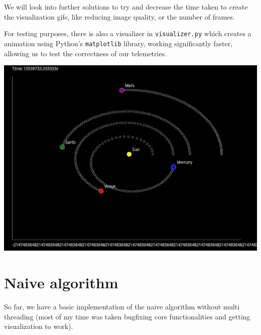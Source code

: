 \documentclass{article}
\begin{document}
We will look into further solutions to try and decrease the time taken to create the visualization gifs, like reducing image quality, or the number of frames. 

For testing purposes, there is also a visualizer in \texttt{visualizer.py} which creates a animation using Python's \texttt{matplotlib} library, working significantly faster, allowing us to test the correctness of our telemetries.

\begin{center}
    \includegraphics[scale=0.5]{teX/screenshot.jpg}
\end{center}

\section{Naive algorithm}

So far, we have a basic implementation of the naive algorithm without multi threading (most of my time was taken bugfixing core functionalities and getting visualization to work). 
\end{document}
